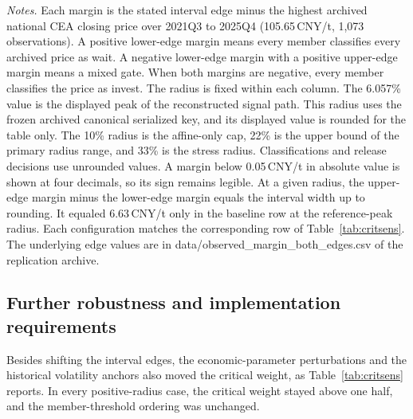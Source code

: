 \documentclass[5p,times,authoryear]{elsarticle}
\theoremstyle{plain}
\begin{document}
\begin{table}[!t]
\parbox{0.97\textwidth}{\footnotesize\emph{Notes.} Each margin is the stated interval edge minus the highest archived national CEA closing price over 2021Q3 to 2025Q4 (105.65\,CNY/t, 1,073 observations). A positive lower-edge margin means every member classifies every archived price as wait. A negative lower-edge margin with a positive upper-edge margin means a mixed gate. When both margins are negative, every member classifies the price as invest. The radius is fixed within each column. The 6.057\% value is the displayed peak of the reconstructed signal path. This radius uses the frozen archived canonical serialized key, and its displayed value is rounded for the table only. The 10\% radius is the affine-only cap, 22\% is the upper bound of the primary radius range, and 33\% is the stress radius. Classifications and release decisions use unrounded values. A margin below 0.05\,CNY/t in absolute value is shown at four decimals, so its sign remains legible. At a given radius, the upper-edge margin minus the lower-edge margin equals the interval width up to rounding. It equaled 6.63\,CNY/t only in the baseline row at the reference-peak radius. Each configuration matches the corresponding row of Table~\ref{tab:critsens}. The underlying edge values are in data/observed\_margin\_both\_edges.csv of the replication archive.}
\end{table}

\subsection{Further robustness and implementation requirements}

Besides shifting the interval edges, the economic-parameter perturbations and the historical volatility anchors also moved the critical weight, as Table~\ref{tab:critsens} reports. In every positive-radius case, the critical weight stayed above one half, and the member-threshold ordering was unchanged.
\end{document}

